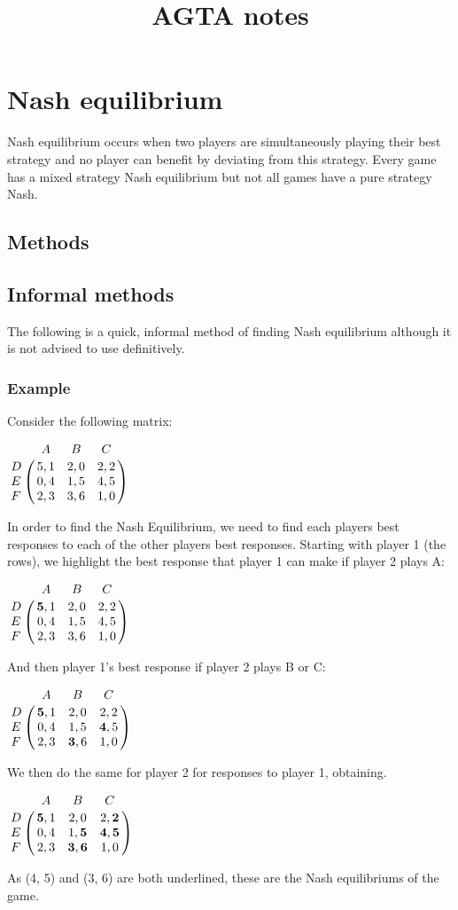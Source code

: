 \documentclass[11pt]{article}
\begin{document}
\title{AGTA notes}

\maketitle

\section{Nash equilibrium}
Nash equilibrium occurs when two players are simultaneously playing their best strategy and no player can benefit by deviating from this strategy. Every game has a mixed strategy Nash equilibrium but not all games have a pure strategy Nash.

\subsection{Methods}

\subsection{Informal methods}
The following is a quick, informal method of finding Nash equilibrium although it is not advised to use definitively.

\subsubsection*{Example}

Consider the following matrix:

\begin{center}
$ \bordermatrix{~ & A    & B    & C    \cr 
				D & 5, 1 & 2, 0 & 2, 2 \cr 
				E & 0, 4 & 1, 5 & 4, 5 \cr
				F & 2, 3 & 3, 6 & 1, 0 \cr}$ \end{center}  
				
In order to find the Nash Equilibrium, we need to find each players best responses to each of the other players best responses. Starting with player 1 (the rows), we highlight the best response that player 1 can make if player 2 plays A:

\begin{center}
$ \bordermatrix{~ & A & B & C \cr 
				D & \textbf{5}, 1 & 2, 0 & 2, 2 \cr 
				E & 0, 4 & 1, 5 & 4, 5 \cr
				F & 2, 3 & 3, 6 & 1, 0 \cr}$  
				\end{center}

And then player 1's best response if player 2 plays B or C:
\begin{center}
$ \bordermatrix{~ & A & B & C \cr 
				D & \textbf{5}, 1 & 2, 0 & 2, 2 \cr 
				E & 0, 4 & 1, 5 & \textbf{4}, 5 \cr
				F & 2, 3 & \textbf{3}, 6 & 1, 0 \cr}$  
\end{center}		
We then do the same for player 2 for responses to player 1, obtaining.
\begin{center}
$ \bordermatrix{~ & A & B & C \cr 
				D & \textbf{5}, 1 & 2, 0 & 2, \textbf{2} \cr 
				E & 0, 4 & 1, \textbf{5} & \textbf{4}, \textbf{5} \cr
				F & 2, 3 & \textbf{3}, \textbf{6} & 1, 0 \cr}$  
\end{center}		
As (4, 5) and (3, 6) are both underlined, these are the Nash equilibriums of the game.
			   
\end{document}
